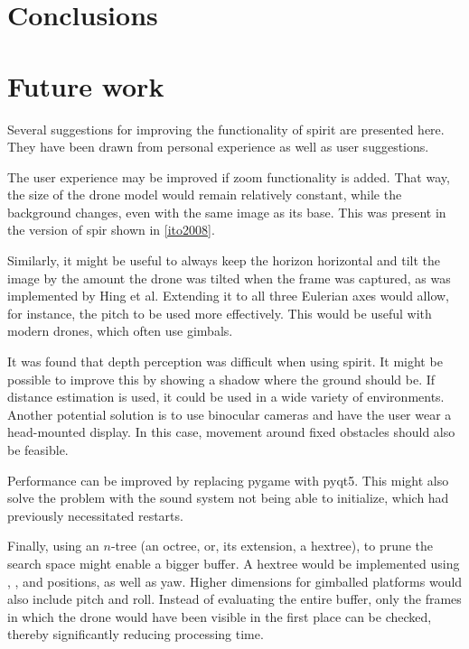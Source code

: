 \chapter{Conclusions}
\label{ch:conclusion}
\chapter{Future work}
Several suggestions for improving the functionality of \gls{spirit} are presented here.
They have been drawn from personal experience as well as user suggestions.

The user experience may be improved if zoom functionality is added.
That way, the size of the drone model would remain relatively constant, while the background changes, even with the same image as its base.
This was present in the version of \gls{spir} shown in \ref{ito2008}.

Similarly, it might be useful to always keep the horizon horizontal and tilt the image by the amount the drone was tilted when the frame was captured, as was implemented by Hing et al.\cite{hing2009}
Extending it to all three Eulerian axes would allow, for instance, the pitch to be used more effectively.
This would be useful with modern drones, which often use gimbals.

It was found that depth perception was difficult when using \gls{spirit}.
It might be possible to improve this by showing a shadow where the ground should be.
If distance estimation is used, it could be used in a wide variety of environments.
Another potential solution is to use binocular cameras and have the user wear a head-mounted display.
In this case, movement around fixed obstacles should also be feasible.

Performance can be improved by replacing \gls{pygame} with \gls{pyqt5}.
This might also solve the problem with the sound system not being able to initialize, which had previously necessitated restarts.

Finally, using an $n$-tree (an octree, or, its extension, a hextree), to prune the search space might enable a bigger buffer.
A hextree would be implemented using , , and  positions, as well as yaw.
Higher dimensions for gimballed platforms would also include pitch and roll.
Instead of evaluating the entire buffer, only the frames in which the drone would have been visible in the first place can be checked, thereby significantly reducing processing time.
